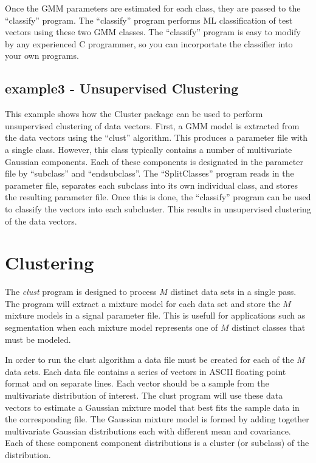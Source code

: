 \documentclass[12pt]{article}
\begin{document}
Once the GMM parameters are estimated for each class,
they are passed to the ``classify'' program.
The ``classify'' program performs ML classification
of test vectors using these two GMM classes.
The ``classify'' program is easy to modify 
by any experienced C programmer, so you can
incorportate the classifier into your own programs.

\subsection{example3 - Unsupervised Clustering}

This example shows how the Cluster package
can be used to perform unsupervised clustering
of data vectors.
First, a GMM model is extracted from the data
vectors using the ``clust'' algorithm.
This produces a parameter file with a single class.
However, this class typically contains a number
of multivariate Gaussian components.
Each of these components is designated in the parameter
file by ``subclass'' and ``endsubclass''.
The ``SplitClasses'' program reads in the parameter
file, separates each subclass into its own
individual class, and stores the resulting
parameter file.
Once this is done, the ``classify'' program
can be used to classify the vectors into each subcluster.
This results in unsupervised clustering of the data vectors.

\section{Clustering}
\label{sec:training}

The {\em clust} program is designed to process $M$
distinct data sets in a single pass.
The program will extract a mixture model for each data
set and store the $M$ mixture models in a signal parameter
file.
This is usefull for applications such as segmentation
when each mixture model represents one of $M$ distinct
classes that must be modeled.

In order to run the clust algorithm 
a data file must be created for each of the $M$ data sets.
Each data file contains a series of vectors 
in ASCII floating point format and on separate lines.
Each vector should be a sample from the multivariate
distribution of interest.
The clust program will use these data vectors to estimate
a Gaussian mixture model that best fits the sample data
in the corresponding file.
The Gaussian mixture model is formed by adding together
multivariate Gaussian distributions each with different
mean and covariance.
Each of these component component distributions is a cluster
(or subclass) of the distribution.
\end{document}

